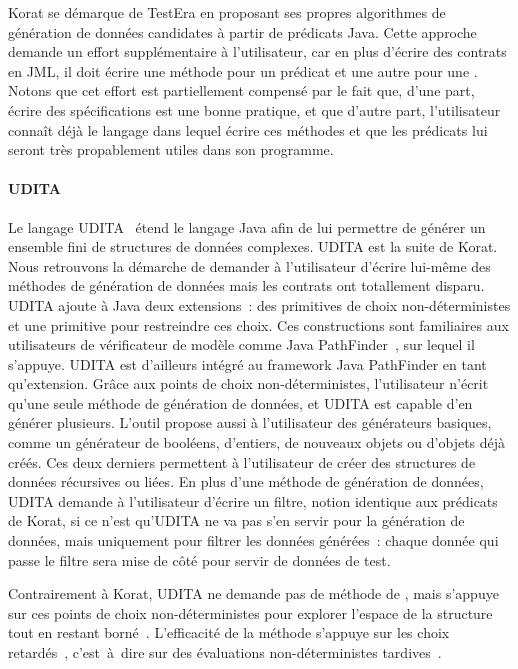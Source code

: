Korat se démarque de TestEra en proposant ses propres algorithmes de génération
de données candidates à partir de prédicats Java. Cette approche demande un
effort supplémentaire à l'utilisateur, car en plus d'écrire des contrats en JML,
il doit écrire une méthode pour un prédicat et une autre pour une
. Notons que cet effort est partiellement compensé par
le fait que, d'une part, écrire des spécifications est une bonne pratique, et
que d'autre part, l'utilisateur connaît déjà le langage dans lequel écrire ces
méthodes et que les prédicats lui seront très propablement utiles dans son
programme.

\paragraph{UDITA} Le langage UDITA~ étend le langage Java
afin de lui permettre de générer un ensemble fini de structures de données
complexes. UDITA est la suite de Korat. Nous retrouvons la démarche de demander
à l'utilisateur d'écrire lui-même des méthodes de génération de données mais les
contrats ont totallement disparu. UDITA ajoute à Java deux extensions~: des
primitives de choix non-déterministes et une primitive pour restreindre ces
choix. Ces constructions sont familiaires aux utilisateurs de vérificateur de
modèle comme Java PathFinder~, sur lequel il s'appuye. UDITA
est d'ailleurs intégré au framework Java PathFinder en tant qu'extension. Grâce
aux points de choix non-déterministes, l'utilisateur n'écrit qu'une seule
méthode de génération de données, et UDITA est capable d'en générer plusieurs.
L'outil propose aussi à l'utilisateur des générateurs basiques, comme un
générateur de booléens, d'entiers, de nouveaux objets ou d'objets déjà créés.
Ces deux derniers permettent à l'utilisateur de créer des structures de données
récursives ou liées. En plus d'une méthode de génération de données, UDITA
demande à l'utilisateur d'écrire un filtre, notion identique aux prédicats de
Korat, si ce n'est qu'UDITA ne va pas s'en servir pour la génération de données,
mais uniquement pour filtrer les données générées~: chaque donnée qui passe le
filtre sera mise de côté pour servir de données de test.

Contrairement à Korat, UDITA ne demande pas de méthode de
, mais s'appuye sur ces points de choix
non-déterministes pour explorer l'espace de la structure tout en restant
borné~. L'efficacité de la méthode s'appuye
sur les choix retardés~, c'est~à~dire sur des évaluations
non-déterministes tardives~.

